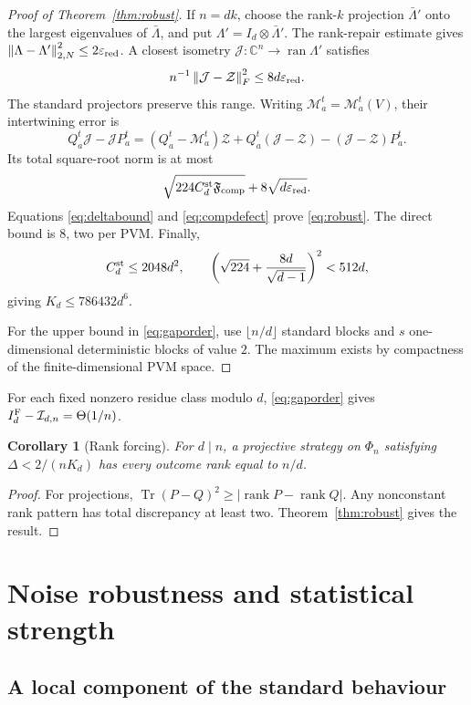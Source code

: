 \documentclass[11pt]{amsart}
\newtheorem{corollary}[theorem]{Corollary}
\theoremstyle{remark}
\theoremstyle{plain}
\numberwithin{equation}{section}
\DeclareMathOperator{\Tr}{Tr}
\DeclareMathOperator{\rank}{rank}
\newcommand{\C}{\mathbb C}
\newcommand{\norm}[1]{\left\|#1\right\|}
\newcommand{\IF}{I_d^{\rm F}}
\newcommand{\RootP}{\mathcal M}
\newcommand{\epsred}{\varepsilon_{\rm red}}
\begin{document}
\begin{proof}[Proof of Theorem~\ref{thm:robust}]
If \(n=dk\), choose the rank-\(k\) projection \(\bar\Lambda'\) onto
the largest eigenvalues of \(\bar\Lambda\), and put
\(\Lambda'=I_d\otimes\bar\Lambda'\).
The rank-repair estimate gives
\(\norm{\Lambda-\Lambda'}_{2,N}^2\le2\epsred\).
A closest isometry
\(\mathcal J:\C^n\to\operatorname{ran}\Lambda'\) satisfies
\[
 n^{-1}\norm{\mathcal J-\mathcal Z}_F^2\le8d\epsred.
\]
The standard projectors preserve this range. Writing
\(\RootP^t_a=\RootP^t_a(V)\), their intertwining error is
\[
 Q^t_a\mathcal J-\mathcal JP^t_a
 =(Q^t_a-\RootP^t_a)\mathcal Z
 +Q^t_a(\mathcal J-\mathcal Z)
 -(\mathcal J-\mathcal Z)P^t_a.
\]
Its total square-root norm is at most
\[
 \sqrt{224C_d^{\rm st}\mathfrak F_{\rm comp}}
 +8\sqrt{d\epsred}.
\]
Equations \eqref{eq:deltabound} and \eqref{eq:compdefect} prove
\eqref{eq:robust}. The direct bound is \(8\), two per PVM.
Finally,
\[
 C_d^{\rm st}\le2048d^2,\qquad
 \left(\sqrt{224}+\frac{8d}{\sqrt{d-1}}\right)^2<512d,
\]
giving \(K_d\le786432d^6\).

For the upper bound in \eqref{eq:gaporder}, use
\(\lfloor n/d\rfloor\) standard blocks and \(s\) one-dimensional
deterministic blocks of value \(2\).
The maximum exists by compactness of the finite-dimensional PVM space.
\end{proof}

For each fixed nonzero residue class modulo \(d\),
\eqref{eq:gaporder} gives
\(\IF-\mathcal I_{d,n}=\Theta(1/n)\).

\begin{corollary}[Rank forcing]\label{cor:ranks}
For \(d\mid n\), a projective strategy on \(\Phi_n\) satisfying
\(\Delta<2/(nK_d)\) has every outcome rank equal to \(n/d\).
\end{corollary}

\begin{proof}
For projections, \(\Tr(P-Q)^2\ge|\rank P-\rank Q|\).
Any nonconstant rank pattern has total discrepancy at least two.
Theorem~\ref{thm:robust} gives the result.
\end{proof}

\section{Noise robustness and statistical strength}\label{sec:operational}

\subsection{A local component of the standard behaviour}
\end{document}
